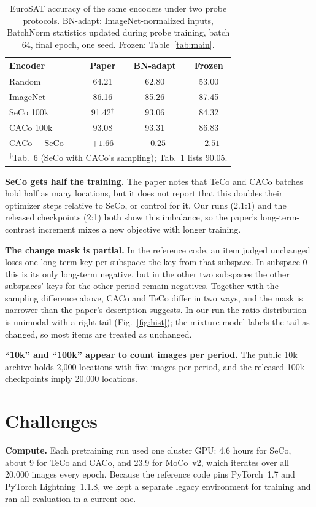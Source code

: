 \documentclass[conference]{IEEEtran}
\begin{document}
\begin{table}[t]
\centering
\caption{EuroSAT accuracy of the same encoders under two probe protocols.
BN-adapt: ImageNet-normalized inputs, BatchNorm statistics updated during probe
training, batch 64, final epoch, one seed. Frozen: Table~\ref{tab:main}.}
\label{tab:protocol}
\begin{tabular}{lccc}
\toprule
Encoder & Paper & BN-adapt & Frozen \\
\midrule
Random & 64.21 & 62.80 & 53.00 \\
ImageNet & 86.16 & 85.26 & 87.45 \\
SeCo 100k & 91.42$^\dagger$ & 93.06 & 84.32 \\
CACo 100k & 93.08 & 93.31 & 86.83 \\
\midrule
CACo $-$ SeCo & $+1.66$ & $+0.25$ & $+2.51$ \\
\bottomrule
\multicolumn{4}{l}{\footnotesize $^\dagger$Tab.~6 (SeCo with CACo's sampling); Tab.~1 lists 90.05.} \\
\end{tabular}
\end{table}

\textbf{SeCo gets half the training.} The paper notes that TeCo and CACo batches
hold half as many locations, but it does not report that this doubles their
optimizer steps relative to SeCo, or control for it. Our runs (2.1:1) and the released
checkpoints (2:1) both show this imbalance, so the paper's long-term-contrast
increment mixes a new objective with longer training.

\textbf{The change mask is partial.} In the reference code, an item judged
unchanged loses one long-term key per subspace: the key from that subspace. In
subspace 0 this is its only long-term negative, but in the other two subspaces
the other subspaces' keys for the other period remain negatives. Together with
the sampling difference above, CACo and TeCo differ in two ways, and the mask is
narrower than the paper's description suggests. In our run the ratio
distribution is unimodal with a right tail (Fig.~\ref{fig:hist}); the mixture
model labels the tail as changed, so most items are treated as unchanged.

\textbf{``10k'' and ``100k'' appear to count images per period.} The public 10k
archive holds 2,000 locations with five images per period, and the released
100k checkpoints imply 20,000 locations.

\section{Challenges}
\textbf{Compute.} Each pretraining run used one cluster GPU: 4.6 hours for SeCo,
about 9 for TeCo and CACo, and 23.9 for MoCo~v2, which iterates over all 20,000
images every epoch. Because the reference code pins PyTorch~1.7 and PyTorch
Lightning~1.1.8, we kept a separate legacy environment for training and ran all
evaluation in a current one.
\end{document}
